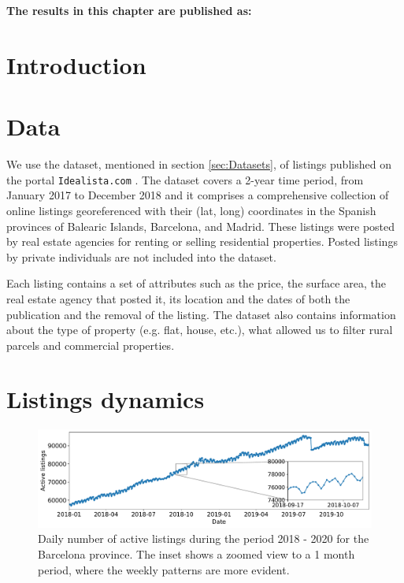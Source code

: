 \vspace{-1.5cm}
\small
\textbf{The results in this chapter are published as:}
\vspace{0.05 cm}

\normalsize
\vspace{0.5 cm}

\section{Introduction}

\section{Data}

We use the dataset, mentioned in section \ref{sec:Datasets}, of listings published on the portal \texttt{Idealista.com} \cite{idealista}. The dataset covers a 2-year time period, from January 2017 to December 2018 and it comprises a comprehensive collection of online listings georeferenced with their (lat, long) coordinates in the Spanish provinces of Balearic Islands, Barcelona, and Madrid. These listings were posted by real estate agencies for renting or selling residential properties. Posted listings by private individuals are not included into the dataset.

Each listing contains a set of attributes such as the price, the surface area, the real estate agency that posted it, its location and the dates of both the publication and the removal of the listing. The dataset also contains information about the type of property (e.g. flat, house, etc.), what allowed us to filter rural parcels and commercial properties.

\section{Listings dynamics}

\begin{figure}
    \label{fig:active_adds}
    \centering
    \includegraphics[width =\textwidth]{Figs/Idealista_dynamics/active_adds.pdf}
	\caption[Active listings evolution.]{Daily number of active listings during the period 2018 - 2020 for the Barcelona province. The inset shows a zoomed view to a 1 month period, where the weekly patterns are more evident.}
\end{figure}

